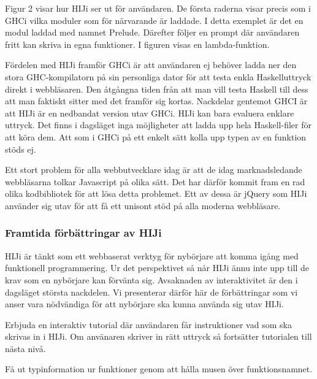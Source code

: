 Figur 2 visar hur HIJi ser ut för användaren. De första raderna visar precis som i GHCi vilka moduler som för närvarande är laddade. I detta exemplet är det en modul laddad med namnet Prelude. Därefter följer en prompt där användaren fritt kan skriva in egna funktioner. I figuren visas en lambda-funktion.



Fördelen med HIJi framför GHCi är att användaren ej behöver ladda ner den stora GHC-kompilatorn på sin personliga dator för att testa enkla Haskelluttryck direkt i webbläsaren. Den åtgångna tiden från  att man vill testa Haskell till dess att man faktiskt sitter med det framför sig kortas. 
Nackdelar gentemot GHCI är att HIJi är en nedbandat version utav GHCi. HIJi kan bara evaluera enklare uttryck. Det finns i dagsläget inga möjligheter att ladda upp hela Haskell-filer för att köra dem. Att som i GHCi på ett enkelt sätt kolla upp  typen av en funktion stöds ej.

Ett stort problem för alla webbutvecklare idag är att de idag marknadsledande webbläsarna tolkar Javascript på olika sätt. Det har därför kommit fram en rad olika kodbibliotek för att lösa detta problemet. Ett av dessa är jQuery som HIJi använder sig utav för att få ett unisont stöd på alla moderna webbläsare. 


\subsubsection{Framtida förbättringar av HIJi}
HIJi är tänkt som ett webbaserat verktyg för nybörjare att komma igång med funktionell programmering. Ur det perspektivet så når HIJi ännu inte upp till de krav som en nybörjare kan förvänta sig. Avsaknaden av interaktivitet är den i dagsläget största nackdelen. Vi presenterar därför här de förbättringar som vi anser vara nödvändiga för att nybörjare ska kunna använda sig utav HIJi.

Erbjuda en interaktiv tutorial där användaren får instruktioner vad som ska skrivas in i HIJi. Om använaren skriver in rätt uttryck så fortsätter tutorialen till nästa nivå.

Få ut typinformation ur funktioner genom att hålla musen över funktionsnamnet. 
